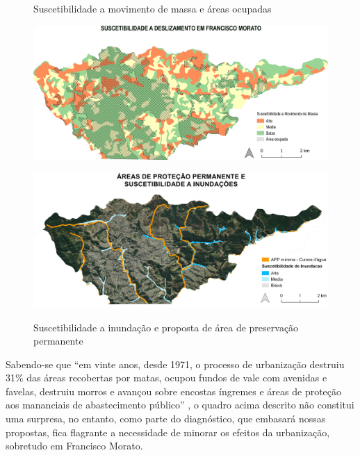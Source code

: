    \begin{figure}[ht]
		\centering
		\caption{Suscetibilidade a movimento de massa e áreas ocupadas}
		\includegraphics[width=\linewidth]{img/DESLIZAMENTOF5_BaixaRes.png}
		\label{fig:movimento_massa}
	
		\caption{Suscetibilidade a inundação e proposta de área de preservação permanente}
		\includegraphics[width=\linewidth]{img/APPeInundacao2_BaixaRes.png}
		\label{fig:inundacao}
	\end{figure}

	Sabendo-se que ``em vinte anos, desde 1971, o processo de urbanização destruiu 31\% das áreas recobertas por matas, ocupou fundos de vale com avenidas e favelas, destruiu morros e avançou sobre encostas íngremes e áreas de proteção aos mananciais de abastecimento público'' \cite[p.45]{meyer2004}, o quadro acima descrito não constitui uma surpresa, no entanto, como parte do diagnóstico, que embasará nossas propostas, fica flagrante a necessidade de minorar os efeitos da urbanização, sobretudo em Francisco Morato.

%

